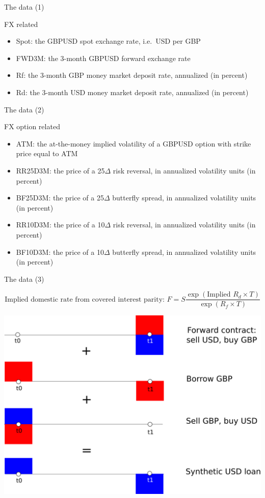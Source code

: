 \begin{frame}{The data (1)}

FX related

\begin{itemize}
\tightlist
\item
  Spot: the GBPUSD spot exchange rate, i.e.~USD per GBP
\item
  FWD3M: the 3-month GBPUSD forward exchange rate
\item
  Rf: the 3-month GBP money market deposit rate, annualized (in percent)
\item
  Rd: the 3-month USD money market deposit rate, annualized (in percent)
\end{itemize}

\end{frame}

\begin{frame}{The data (2)}

FX option related

\begin{itemize}
\tightlist
\item
  ATM: the at-the-money implied volatility of a GBPUSD option with
  strike price equal to ATM
\item
  RR25D3M: the price of a 25\(\Delta\) risk reversal, in annualized
  volatility units (in percent)
\item
  BF25D3M: the price of a 25\(\Delta\) butterfly spread, in annualized
  volatility units (in percent)
\item
  RR10D3M: the price of a 10\(\Delta\) risk reversal, in annualized
  volatility units (in percent)
\item
  BF10D3M: the price of a 10\(\Delta\) butterfly spread, in annualized
  volatility units (in percent)
\end{itemize}

\end{frame}

\begin{frame}{The data (3)}

\[ \text{Implied domestic rate from covered interest parity:  }F = S \frac{\exp \left(\text{Implied } R_d \times T\right)}{\exp \left(R_f \times T\right)} \]

\begin{center}\includegraphics[width=0.6\linewidth]{images/figSyntheticUSDLoan} \end{center}

\end{frame}

